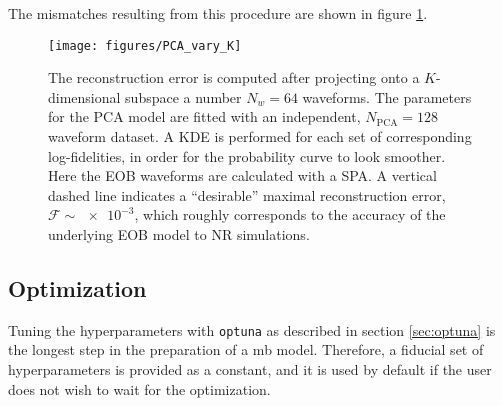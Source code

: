 \documentclass[main.tex]{subfiles}
\begin{document}
The mismatches resulting from this procedure are shown in figure \ref{fig:PCA_vary_K}.

\begin{figure}[ht]
\centering
\texttt{[image: figures/PCA\_vary\_K]}
\caption{The reconstruction error is computed after projecting onto a \(K\)-dimensional subspace a number \(N_w=64\) waveforms. The parameters for the \ac{PCA} model are fitted with an independent, \(N _{\text{PCA}} = 128\) waveform dataset. A \ac{KDE} is performed for each set of corresponding log-fidelities, in order for the probability curve to look smoother.
Here the \ac{EOB} waveforms are calculated with a \ac{SPA}. 
A vertical dashed line indicates a ``desirable'' maximal reconstruction error, \(\mathcal{F} \sim \num{e-3}\), which roughly corresponds to the accuracy of the underlying \ac{EOB} model to \ac{NR} simulations.
}
\label{fig:PCA_vary_K}
\end{figure}

\subsection{Optimization}

Tuning the hyperparameters with \texttt{optuna} as described in section \ref{sec:optuna} is the longest step in the preparation of a \ac{mb} model. 
Therefore, a fiducial set of hyperparameters is provided as a constant, and it is used by default if the user does not wish to wait for the optimization. 
\end{document}
